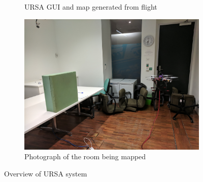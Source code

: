 \documentclass[capstone_report.tex]{subfiles}
\begin{document}
\begin{figure}[H]
\begin{subfigure}[t]{0.49\textwidth}
        \caption{URSA GUI and map generated from flight}
        \label{fig:mappinginflight}
    \end{subfigure}
    \hfill
    \begin{subfigure}[t]{0.49\textwidth}
        \centering
        \includegraphics[width=\textwidth]{imgs/mapping/room_mapped.jpg}
        \caption{Photograph of the room being mapped}
        \label{fig:roomphoto}
    \end{subfigure}
    \caption{Overview of URSA system}
    \label{fig:map_env_RVIZ}
\end{figure}
\end{document}

